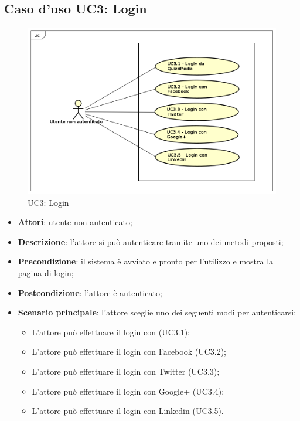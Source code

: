 \subsection{Caso d'uso UC3: Login}
\label{UC3}
\begin{figure}
	\centering
	\includegraphics[scale=0.5]{UML/UC3.png}
	\caption{UC3: Login}
\end{figure}
\FloatBarrier
\begin{itemize}
	\item \textbf{Attori}: utente non autenticato;
	\item \textbf{Descrizione}: l'attore si può autenticare tramite uno dei metodi proposti;
	\item \textbf{Precondizione}: il sistema è avviato e pronto per l'utilizzo e mostra la pagina di login;
	\item \textbf{Postcondizione}: l'attore è autenticato;
	\item \textbf{Scenario principale}: l'attore sceglie uno dei seguenti modi per autenticarsi:
		\begin{itemize}
			\item L'attore può effettuare il login con \progetto (UC3.1);
			\item L'attore può effettuare il login con Facebook (UC3.2);
			\item L'attore può effettuare il login con Twitter (UC3.3);
			\item L'attore può effettuare il login con Google+ (UC3.4);
			\item L'attore può effettuare il login con Linkedin (UC3.5).
		\end{itemize}
\end{itemize}


